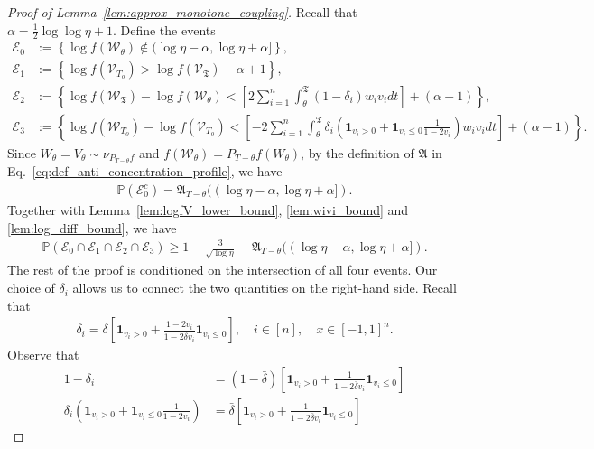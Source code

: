 \documentclass[11pt]{article}
\newcommand{\excess}{\alpha}
\newcommand{\fA}{\mathfrak{A}}
\newcommand{\bdelta}{\bar{\delta}}
\newcommand{\stopT}{{\boldsymbol{\mathfrak{T}}}}
\newcommand{\uV}{V}
\newcommand{\uW}{W}
\newcommand{\To}{{T_o}}
\newcommand{\rV}{\mathscr{V}}
\newcommand{\rW}{\mathscr{W}}
\newcommand{\cE}{\mathscr{E}}
\theoremstyle{named}
\theoremstyle{plain}
\newcommand{\defn}{:=}
\newcommand{\Prob}{\ensuremath{{\mathbb{P}}}}
\newcommand{\brackets}[1]{\left[ #1 \right]}
\newcommand{\parenth}[1]{\left( #1 \right)}
\newcommand{\braces}[1]{\left\{ #1 \right \}}
\begin{document}
\begin{proof}[Proof of Lemma~\ref{lem:approx_monotone_coupling}]
  Recall that $\excess = \frac12 \log \log \eta + 1$. Define the events
  \begin{align*}
    \cE_0 &\defn \braces{\log f(\rW_\theta) \notin (\log \eta - \excess, \log \eta + \excess]}, \\
    \cE_1 &\defn \braces{\log f (\rV_{\To}) > \log f (\rV_{\stopT}) - \excess + 1}, \\
    \cE_2 &\defn \braces{\log f (\rW_{\stopT}) -  \log f (\rW_{\theta}) < \brackets{2 \sum_{i=1}^n \int_\theta^\stopT   (1-\delta_i) w_i v_i dt } + (\excess - 1)}, \\
    \cE_3 &\defn \braces{\log f(\rW_\To) - \log f(\rV_\To) < \brackets{- 2 \sum_{i=1}^n \int_\theta^{\stopT} \delta_i \parenth{\mathbf{1}_{v_i > 0} + \mathbf{1}_{v_i \leq 0} \frac{1}{1-2v_i} } w_i v_i dt } + (\excess - 1)}. 
  \end{align*}
  Since $\uW_\theta = \uV_\theta \sim \nu_{P_{T-\theta} f}$ and $f(\rW_\theta) = P_{T-\theta} f(\uW_\theta)$, by the definition of $\fA$ in Eq.~\eqref{eq:def_anti_concentration_profile}, we have
  \begin{align*}
    \Prob(\cE_0^c) = \fA_{T - \theta}((\log \eta - \excess, \log \eta + \excess]).
  \end{align*}
  Together with Lemma~\ref{lem:logfV_lower_bound}, \ref{lem:wivi_bound} and \ref{lem:log_diff_bound}, we have
  \begin{align}
    \label{eq:E123_bound}
    \Prob(\cE_0 \cap \cE_1 \cap \cE_2 \cap \cE_3) \geq 1 - \frac{3}{\sqrt{\log \eta}} - \fA_{T - \theta}((\log \eta - \excess, \log \eta + \excess]).
  \end{align}
  The rest of the proof is conditioned on the intersection of all four events. Our choice of $\delta_i$ allows us to connect the two quantities on the right-hand side. Recall that
\begin{align*}
  \delta_i = \bdelta  \brackets{ \mathbf{1}_{v_i > 0} + \frac{1-2v_i}{1 - 2 \bdelta v_i} \mathbf{1}_{v_i \leq 0}} , \quad i \in [n],\quad x\in [-1,1]^n.
\end{align*}
Observe that
\begin{align*}
  1 - \delta_i &= (1-\bdelta) \brackets{\mathbf{1}_{v_i > 0} + \frac{1}{1-2\bdelta v_i} \mathbf{1}_{v_i \leq 0}} \\
  \delta_i \parenth{\mathbf{1}_{v_i > 0} + \mathbf{1}_{v_i \leq 0} \frac{1}{1-2v_i}}
  &= \bdelta\brackets{\mathbf{1}_{v_i > 0} + \frac{1}{1-2 \bdelta v_i} \mathbf{1}_{v_i \leq 0} }

\end{align*}
\end{proof}
\end{document}
